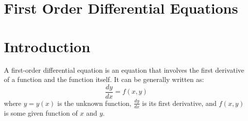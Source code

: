 \documentclass[a4paper,12pt]{article}
\begin{document}
\pagestyle{empty} 

\section{\huge\textbf{First Order Differential Equations}}

\section{Introduction}
A first-order differential equation is an equation that involves the first derivative of a function and the function itself. It can be generally written as:
\begin{equation}
    \frac{dy}{dx} = f(x, y)
\end{equation}
where \( y = y(x) \) is the unknown function, \( \frac{dy}{dx} \) is its first derivative, and \( f(x, y) \) is some given function of \( x \) and \( y \).

\end{document}
